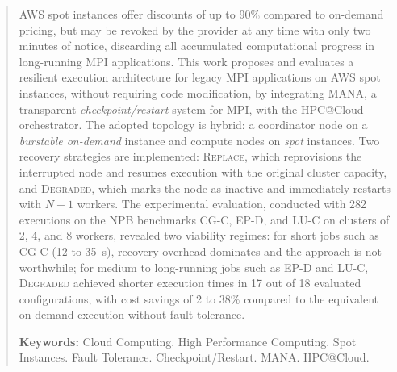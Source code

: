 \begin{abstract}
AWS spot instances offer discounts of up to 90\% compared to on-demand pricing,
but may be revoked by the provider at any time with only two minutes of notice,
discarding all accumulated computational progress in long-running MPI
applications. This work proposes and evaluates a resilient execution
architecture for legacy MPI applications on AWS spot instances, without
requiring code modification, by integrating MANA, a transparent
\textit{checkpoint/restart} system for MPI, with the HPC@Cloud orchestrator.
The adopted topology is hybrid: a coordinator node on a \textit{burstable
on-demand} instance and compute nodes on \textit{spot} instances. Two recovery
strategies are implemented: \textsc{Replace}, which reprovisions the interrupted
node and resumes execution with the original cluster capacity, and
\textsc{Degraded}, which marks the node as inactive and immediately restarts
with $N{-}1$ workers. The experimental evaluation, conducted with 282 executions
on the NPB benchmarks CG-C, EP-D, and LU-C on clusters of 2, 4, and 8 workers,
revealed two viability regimes: for short jobs such as CG-C (12 to 35~s),
recovery overhead dominates and the approach is not worthwhile; for medium to
long-running jobs such as EP-D and LU-C, \textsc{Degraded} achieved shorter
execution times in 17 out of 18 evaluated configurations, with cost savings of
2 to 38\% compared to the equivalent on-demand execution without fault
tolerance.

\vspace{\baselineskip}
\textbf{Keywords:} Cloud Computing. High Performance Computing. Spot Instances.
Fault Tolerance. Checkpoint/Restart. MANA. HPC@Cloud.
\end{abstract}


\listoffigures*
\listoftables*
\listofalgorithms*

\glsaddall
\listadesiglas*[7em]

\tableofcontents*%

